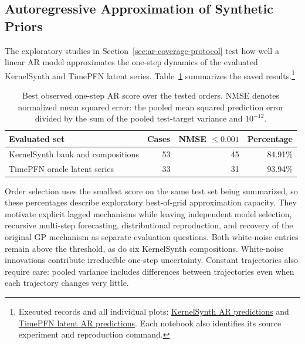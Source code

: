 \subsection{Autoregressive Approximation of Synthetic Priors}
\label{sec:ar-coverage-results}

The exploratory studies in Section~\ref{sec:ar-coverage-protocol} test how
well a linear AR model approximates the one-step dynamics of the evaluated
KernelSynth and TimePFN latent series. Table~\ref{tab:implemented-ar-evidence}
summarizes the saved results.\footnote{Executed records and all individual plots:
\href{https://github.com/MateusWiteck/tsfmxai/blob/27ec9cf/experiments/autoregressive_process_coverage/01_kernelsynth_ar_prediction_results.ipynb}{KernelSynth AR predictions}
and
\href{https://github.com/MateusWiteck/tsfmxai/blob/27ec9cf/experiments/autoregressive_process_coverage/02_timepfn_lmc_ar_prediction_results.ipynb}{TimePFN latent AR predictions}.
Each notebook also identifies its source experiment and reproduction command.}

\begin{table}[H]
\centering\small
\begin{tabular}{@{}lrrr@{}}
\toprule
Evaluated set & Cases & NMSE $\leq 0.001$ & Percentage \\
\midrule
KernelSynth bank and compositions & 53 & 45 & 84.91\% \\
TimePFN oracle latent series & 33 & 31 & 93.94\% \\
\bottomrule
\end{tabular}
\caption{Best observed one-step AR score over the tested orders.
NMSE denotes normalized mean squared error: the pooled mean squared prediction
error divided by the sum of the pooled test-target variance and $10^{-12}$.}
\label{tab:implemented-ar-evidence}
\end{table}

Order selection uses the smallest score on the same test set being summarized,
so these percentages describe exploratory best-of-grid approximation capacity.
They motivate explicit lagged mechanisms while leaving independent model
selection, recursive multi-step forecasting, distributional reproduction, and
recovery of the original GP mechanism as separate evaluation questions. Both
white-noise entries remain above the threshold, as do six KernelSynth
compositions. White-noise innovations contribute irreducible one-step
uncertainty. Constant trajectories also require care: pooled variance includes
differences between trajectories even when each trajectory changes very little.
